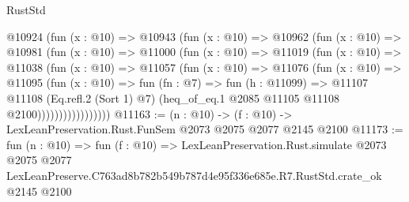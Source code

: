 \begin{lexlean}{RustStd}
\begin{coremodule}
              @10924
                (fun (x : @10) =>
                @10943
                  (fun (x : @10) =>
                  @10962
                    (fun (x : @10) =>
                    @10981
                      (fun (x : @10) =>
                      @11000
                        (fun (x : @10) =>
                        @11019
                          (fun (x : @10) =>
                          @11038
                            (fun (x : @10) =>
                            @11057
                              (fun (x : @10) =>
                              @11076
                                (fun (x : @10) =>
                                @11095
                                  (fun (x : @10) =>
                                  fun (fn : @7) =>
                                  fun (h : @11099) =>
                                  @11107
                                    @11108
                                    (Eq.refl.{2} (Sort 1) @7)
                                    (heq_of_eq.{1} @2085 @11105 @11108 @2100)))))))))))))))))
@11163 := (n : @10) -> (f : @10) -> LexLeanPreservation.Rust.FunSem @2073 @2075 @2077 @2145 @2100
@11173 := fun (n : @10) =>
  fun (f : @10) =>
  LexLeanPreservation.Rust.simulate
    @2073
    @2075
    @2077
    LexLeanPreserve.C763ad8b782b549b787d4e95f336e685e.R7.RustStd.crate_ok
    @2145
    @2100
\end{coremodule}
\end{lexlean}
